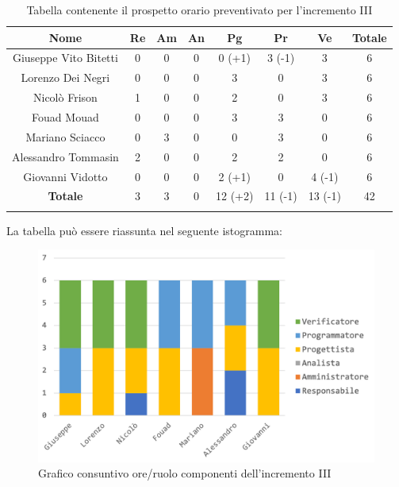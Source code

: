 			\begin{longtable}{|c|c|c|c|c|c|c|c}
				\hline
				\rowcolor{lighter-grayer}
				\textbf{Nome} & \textbf{Re} & \textbf{Am} & \textbf{An} & \textbf{Pg}  & \textbf{Pr}   & \textbf{Ve} & \textbf{Totale} \\
				\hline
				\endfirsthead
				\hline
				Giuseppe Vito Bitetti & 0 & 0 & 0 & 0 (+1) & 3 (-1) & 3 & 6\\
				\hline
				\hline
				Lorenzo Dei Negri & 0 & 0 & 0 & 3 & 0 & 3 & 6\\
				\hline
				\hline
				Nicolò Frison & 1 & 0 & 0 & 2 & 0 & 3 & 6 \\
				\hline
				\hline
				Fouad Mouad & 0 & 0 & 0 & 3 & 3 & 0 & 6\\
				\hline
				\hline
				Mariano Sciacco & 0 & 3 & 0 & 0 & 3 & 0 & 6 \\
				\hline
				\hline
				Alessandro Tommasin & 2 & 0 & 0 & 2 & 2 & 0 & 6\\
				\hline
				\hline
				Giovanni Vidotto & 0 & 0 & 0 & 2 (+1) & 0 & 4 (-1) & 6 \\
				\hline 
				\textbf{Totale} & 3 &  3 & 0 & 12 (+2) & 11 (-1) & 13 (-1) & 42 \\
				\hline 
				
				\caption{Tabella contenente il prospetto orario preventivato per l'incremento III}
			\end{longtable}
			\pagebreak	
			
			La tabella può essere riassunta nel seguente istogramma:
			
			\begin{figure}[H]
				\centering
				\includegraphics[width=0.8\linewidth]{images/consuntivo/ConsIncr3-1.png}
				\caption{Grafico consuntivo ore/ruolo componenti dell'incremento III}
				\label{fig:consuntivo grafico suddivione ruoli incremento III}
			\end{figure}
			
